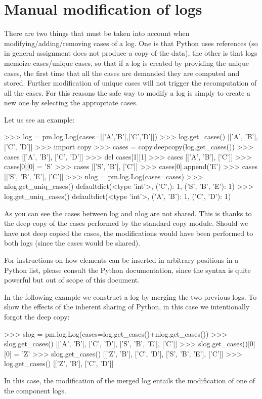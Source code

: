 \documentclass[a4paper,10pt]{book}
\begin{document}
\section{Manual modification of logs}
\label{sec:log.manual}

There are two things that must be taken into account when modifying/adding/removing cases of a log. One is that Python uses references (so in general assignment does not produce a copy of the data), the other is that logs memoize cases/unique cases, so that if a log is created by providing the unique cases, the first time that all the cases are demanded they are computed and stored. Further modification of unique cases will not trigger the recomputation of all the cases. For this reasons the safe way to modify a log is simply to create a new one by selecting the appropriate cases.

Let us see an example:\\
\begin{pycode}
>>> log = pm.log.Log(cases=[['A','B'],['C','D']])
>>> log.get_cases()
[['A', 'B'], ['C', 'D']]
>>> import copy
>>> cases = copy.deepcopy(log.get_cases())
>>> cases
[['A', 'B'], ['C', 'D']]
>>> del cases[1][1]
>>> cases
[['A', 'B'], ['C']]
>>> cases[0][0] = 'S'
>>> cases
[['S', 'B'], ['C']]
>>> cases[0].append('E')
>>> cases
[['S', 'B', 'E'], ['C']]
>>> nlog = pm.log.Log(cases=cases)
>>> nlog.get_uniq_cases()
defaultdict(<type 'int'>, {('C',): 1, ('S', 'B', 'E'): 1})
>>> log.get_uniq_cases()
defaultdict(<type 'int'>, {('A', 'B'): 1, ('C', 'D'): 1})
\end{pycode}

As you can see the cases between log and nlog are not shared. This is thanks to the deep copy of the cases performed by the standard copy module. Should we have not deep copied the cases, the modifications would have been performed to both logs (since the cases would be shared).

For instructions on how elements can be inserted in arbitrary positions in a Python list, please consult the Python documentation, since the syntax is quite powerful but out of scope of this document.

In the following example we construct a log by merging the two previous logs. To show the effects of the inherent sharing of Python, in this case we intentionally forgot the deep copy:\\
\begin{pycode}
>>> slog = pm.log.Log(cases=log.get_cases()+nlog.get_cases())
>>> slog.get_cases()
[['A', 'B'], ['C', 'D'], ['S', 'B', 'E'], ['C']]
>>> slog.get_cases()[0][0] = 'Z'
>>> slog.get_cases()
[['Z', 'B'], ['C', 'D'], ['S', 'B', 'E'], ['C']]
>>> log.get_cases()
[['Z', 'B'], ['C', 'D']]
\end{pycode}
In this case, the modification of the merged log entails the modification of one of the component logs.
\end{document}
